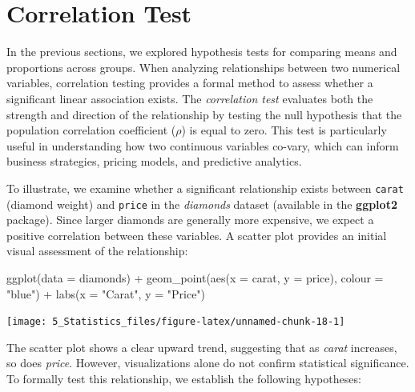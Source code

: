 \documentclass[
  11pt,
]{book}
\makeatletter
\newenvironment{Shaded}{}{}
\newcommand{\AttributeTok}[1]{#1}
\newcommand{\FunctionTok}[1]{#1}
\newcommand{\NormalTok}[1]{#1}
\newcommand{\SpecialCharTok}[1]{\textcolor[rgb]{0.39,0.39,0.39}{#1}}
\newcommand{\StringTok}[1]{\textcolor[rgb]{0.39,0.39,0.39}{#1}}
\newenvironment{kframe}{%
\medskip{}
\setlength{\fboxsep}{.8em}
 \def\at@end@of@kframe{}%
 \ifinner\ifhmode%
  \def\at@end@of@kframe{\end{minipage}}%
  \begin{minipage}{\columnwidth}%
 \fi\fi%
 \def\FrameCommand##1{\hskip\@totalleftmargin \hskip-\fboxsep
 \colorbox{shadecolor}{##1}\hskip-\fboxsep
     \hskip-\linewidth \hskip-\@totalleftmargin \hskip\columnwidth}%
 \MakeFramed {\advance\hsize-\width
   \@totalleftmargin\z@ \linewidth\hsize
   \@setminipage}}%
 {\par\unskip\endMakeFramed%
 \at@end@of@kframe}
\renewenvironment{Shaded}{\begin{kframe}}{\end{kframe}}
\theoremstyle{definition}
\theoremstyle{definition}
\theoremstyle{definition}
\theoremstyle{definition}
\theoremstyle{remark}
\makeatother
\begin{document}
\section{Correlation Test}\label{correlation-test}

In the previous sections, we explored hypothesis tests for comparing means and proportions across groups. When analyzing relationships between two numerical variables, correlation testing provides a formal method to assess whether a significant linear association exists. The \emph{correlation test} evaluates both the strength and direction of the relationship by testing the null hypothesis that the population correlation coefficient (\(\rho\)) is equal to zero. This test is particularly useful in understanding how two continuous variables co-vary, which can inform business strategies, pricing models, and predictive analytics.

To illustrate, we examine whether a significant relationship exists between \texttt{carat} (diamond weight) and \texttt{price} in the \emph{diamonds} dataset (available in the \textbf{ggplot2} package). Since larger diamonds are generally more expensive, we expect a positive correlation between these variables. A scatter plot provides an initial visual assessment of the relationship:

\begin{Shaded}
\begin{Highlighting}[]
\FunctionTok{ggplot}\NormalTok{(}\AttributeTok{data =}\NormalTok{ diamonds) }\SpecialCharTok{+}
    \FunctionTok{geom\_point}\NormalTok{(}\FunctionTok{aes}\NormalTok{(}\AttributeTok{x =}\NormalTok{ carat, }\AttributeTok{y =}\NormalTok{ price), }\AttributeTok{colour =} \StringTok{"blue"}\NormalTok{) }\SpecialCharTok{+}
    \FunctionTok{labs}\NormalTok{(}\AttributeTok{x =} \StringTok{"Carat"}\NormalTok{, }\AttributeTok{y =} \StringTok{"Price"}\NormalTok{) }
\end{Highlighting}
\end{Shaded}

\begin{center}\texttt{[image: 5\_Statistics\_files/figure-latex/unnamed-chunk-18-1]} \end{center}

The scatter plot shows a clear upward trend, suggesting that as \emph{carat} increases, so does \emph{price}. However, visualizations alone do not confirm statistical significance. To formally test this relationship, we establish the following hypotheses:
\end{document}
